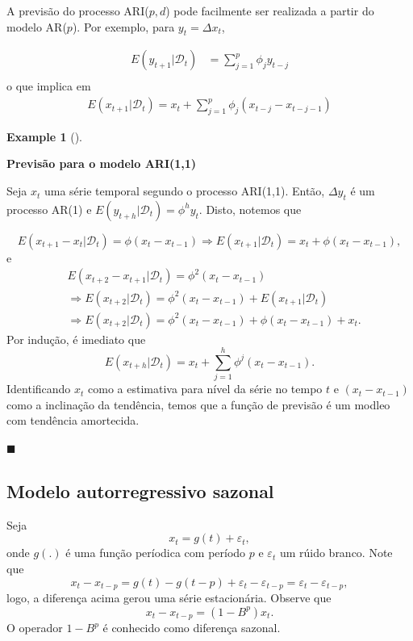 \documentclass[
  letterpaper,
  DIV=11,
  numbers=noendperiod]{scrartcl}
\theoremstyle{definition}
\newtheorem{example}{Example}[chapter]
\theoremstyle{definition}
\theoremstyle{plain}
\theoremstyle{plain}
\theoremstyle{remark}
\begin{document}
A previsão do processo ARI(\(p,d\)) pode facilmente ser realizada a
partir do modelo AR(\(p\)). Por exemplo, para \(y_t=\Delta x_t\),

\begin{align}E(y_{t+1}|\mathcal{D}_t)&=\sum_{j=1}^p \phi_j y_{t-j}\\\end{align}
o que implica em
\begin{align} E(x_{t+1}|\mathcal{D}_t)=x_t+\sum_{j=1}^p\phi_j(x_{t-j}-x_{t-j-1})\end{align}

\begin{example}[]\protect\hypertarget{exm-}{}\label{exm-}

\textbf{Previsão para o modelo ARI(1,1)}

Seja \(x_t\) uma série temporal segundo o processo ARI(1,1). Então,
\(\Delta y_t\) é um processo AR(1) e
\(E(y_{t+h}|\mathcal{D}_t)=\phi^h y_t\). Disto, notemos que

\[E(x_{t+1}-x_t|\mathcal{D}_t)=\phi (x_{t}-x_{t-1})\Rightarrow E(x_{t+1}|\mathcal{D}_t)=x_t+\phi(x_t-x_{t-1}),\]
e
\begin{align}&E(x_{t+2}-x_{t+1}|\mathcal{D}_t)=\phi^2 (x_t-x_{t-1})\\&\Rightarrow E(x_{t+2}|\mathcal{D}_t)=\phi^2 (x_{t}-x_{t-1})+E(x_{t+1}|\mathcal{D}_t)\\ &\Rightarrow E(x_{t+2}|\mathcal{D}_t)=\phi^2 (x_{t}-x_{t-1})+\phi (x_{t}-x_{t-1})+x_t.\end{align}
Por indução, é imediato que
\[E(x_{t+h}|\mathcal{D}_t)=x_t+\sum_{j=1}^h \phi^{j}(x_t-x_{t-1}).\]
Identificando \(x_t\) como a estimativa para nível da série no tempo
\(t\) e \((x_t-x_{t-1})\) como a inclinação da tendência, temos que a
função de previsão é um modleo com tendência amortecida.

\(\blacksquare\)

\end{example}

\subsection{Modelo autorregressivo
sazonal}\label{modelo-autorregressivo-sazonal}

Seja \[x_t = g(t)+\varepsilon_t,\] onde \(g(.)\) é uma função períodica
com período \(p\) e \(\varepsilon_t\) um rúido branco. Note que
\[x_t-x_{t-p}=g(t)-g(t-p)+\varepsilon_t-\varepsilon_{t-p}=\varepsilon_t-\varepsilon_{t-p},\]
logo, a diferença acima gerou uma série estacionária. Observe que
\[x_t-x_{t-p}=(1-B^p)x_t.\] O operador \(1-B^p\) é conhecido como
diferença sazonal.
\end{document}
